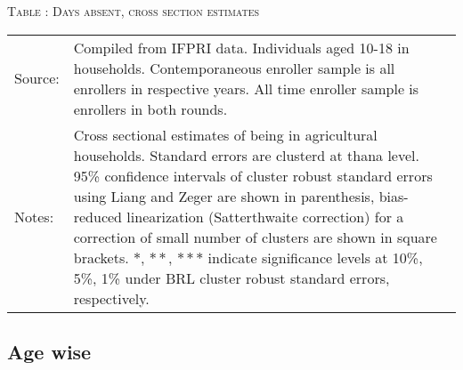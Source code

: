 \begin{table}
\hfil\textsc{\footnotesize Table \thetable: Days absent, cross section estimates \label{DaysAbsent2002}}\\
\setlength{\tabcolsep}{1pt}
\renewcommand{\arraystretch}{.525}
\hspace{-1.5cm}

\renewcommand{\arraystretch}{1}
\hfil\begin{tabular}{>{\hfill\scriptsize}p{1cm}<{}>{\scriptsize}p{12cm}<{\hfill}}
Source:& Compiled from IFPRI data. Individuals aged 10-18 in households. Contemporaneous enroller sample is all enrollers in respective years. All time enroller sample is enrollers in both rounds.\\[-1ex]
Notes:& Cross sectional estimates of being in agricultural households. Standard errors are clusterd at thana level. 95\% confidence intervals of cluster robust standard errors using Liang and Zeger are shown in parenthesis, bias-reduced linearization (Satterthwaite correction) for a correction of small number of clusters are shown in square brackets. $*$, $**$, $***$ indicate significance levels at 10\%, 5\%, 1\% under BRL cluster robust standard errors, respectively. 
\end{tabular}
\end{table}


\subsection{Age wise}


